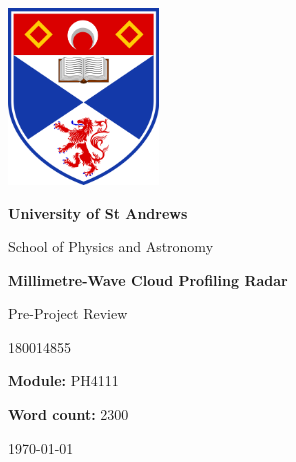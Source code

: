 \documentclass{article}
\title {\mytitle}
\author{\myauthor}
\date  {\mydate}
\newcommand\mytitle    {Millimetre-Wave Cloud Profiling Radar}
\newcommand\mysubtitle {Pre-Project Review}
\newcommand\myauthor   {180014855}
\newcommand\mymodule   {PH4111}
\newcommand\mywordcount{2300}
\begin{document}
\begin{titlepage}
	\centering
	{\includegraphics[width=0.3\textwidth]{uos-logo}}
	\par
	{\LARGE\bfseries University of St Andrews\par}
	{\LARGE School of Physics and Astronomy\par}
	\vspace{1.5cm}
	{\huge\bfseries\mytitle\par}
	{\Large\mysubtitle\par}
	\vspace{2cm}
	{\Large\myauthor\par}
	{\large\textbf{Module:} \mymodule\par}
	{\large\textbf{Word count:} \mywordcount\par}
	\vfill
	{\large\today\par}
\end{titlepage}
\end{document}

